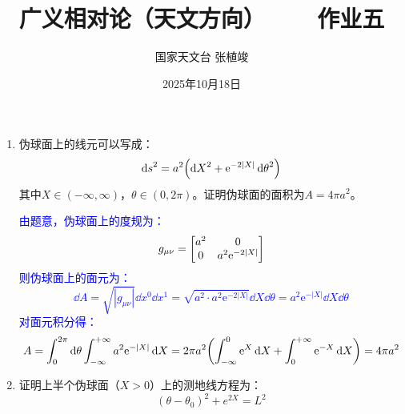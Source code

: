 \documentclass[a4paper]{article}
\title{\textbf{广义相对论（天文方向）\ \ \ \ 作业五}}
\author{国家天文台 张植竣}
\date{2025年10月18日}
\begin{document}
\maketitle

\begin{enumerate}
    \item 伪球面上的线元可以写成：
    \[
        \dd{s}^2 = a^2 \qty(\dd{X}^2 + \mathrm{e}^{-2|X|} \dd{\theta}^2)
    \]
    其中$X \in (-\infty, \infty)$，$\theta \in (0, 2\pi)$。证明伪球面的面积为$A = 4\pi a^2$。

    \textcolor{blue}{
    由题意，伪球面上的度规为：
    \[
        g_{\mu\nu} = \mqty[a^2 & 0 \\ 0 & a^2 \mathrm{e}^{-2|X|}]
    \]
    则伪球面上的面元为：
    \[
        \dd{A} = \sqrt{|g_{\mu\nu}|} \dd{x}^0 \dd{x}^1 = \sqrt{a^2 \cdot a^2 \mathrm{e}^{-2|X|}} \dd{X} \dd{\theta} = a^2 \mathrm{e}^{-|X|} \dd{X} \dd{\theta}
    \]
    对面元积分得：
    \[
        A = \int_0^{2\pi} \dd{\theta} \int_{-\infty}^{+\infty} a^2 \mathrm{e}^{-|X|} \dd{X} = 2\pi a^2 \qty(\int_{-\infty}^{0} \mathrm{e}^{X} \dd{X} + \int_{0}^{+\infty} \mathrm{e}^{-X} \dd{X}) = 4\pi a^2
    \]
    }

    \item 证明上半个伪球面（$X > 0$）上的测地线方程为：
    \[
        (\theta - \theta_0)^2 + e^{2X} = L^2
    \]


\end{enumerate}
\end{document}
